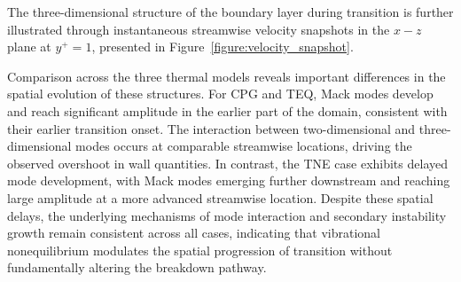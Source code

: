 
The three-dimensional structure of the boundary layer during transition is further illustrated through instantaneous streamwise velocity snapshots in the $x-z$ plane at $y^+ = 1$, presented in Figure~\ref{figure:velocity_snapshot}.

Comparison across the three thermal models reveals important differences in the spatial evolution of these structures. For \gls{CPG} and \gls{TEQ}, Mack modes develop and reach significant amplitude in the earlier part of the domain, consistent with their earlier transition onset. The interaction between two-dimensional and three-dimensional modes occurs at comparable streamwise locations, driving the observed overshoot in wall quantities. In contrast, the \gls{TNE} case exhibits delayed mode development, with Mack modes emerging further downstream and reaching large amplitude at a more advanced streamwise location. Despite these spatial delays, the underlying mechanisms of mode interaction and secondary instability growth remain consistent across all cases, indicating that vibrational nonequilibrium modulates the spatial progression of transition without fundamentally altering the breakdown pathway. 

